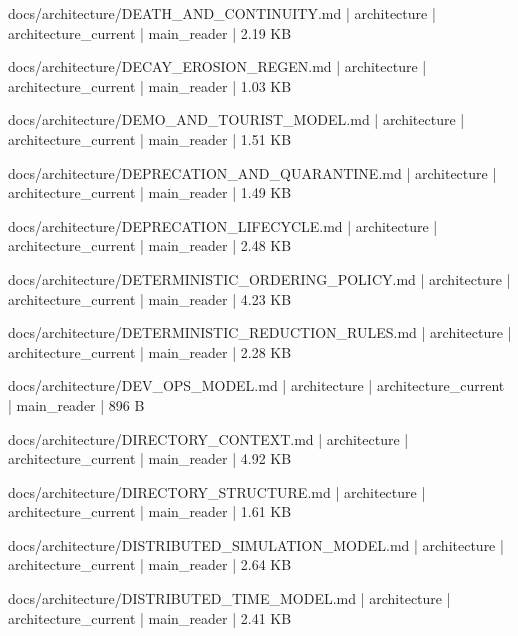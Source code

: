 \documentclass[11pt,a4paper]{report}
\begin{document}
{\small\ttfamily\raggedright docs/\allowbreak{}architecture/\allowbreak{}DEATH\_AND\_CONTINUITY.\allowbreak{}md | architecture | architecture\_current | main\_reader | 2.\allowbreak{}19 KB\par}
{\small\ttfamily\raggedright docs/\allowbreak{}architecture/\allowbreak{}DECAY\_EROSION\_REGEN.\allowbreak{}md | architecture | architecture\_current | main\_reader | 1.\allowbreak{}03 KB\par}
{\small\ttfamily\raggedright docs/\allowbreak{}architecture/\allowbreak{}DEMO\_AND\_TOURIST\_MODEL.\allowbreak{}md | architecture | architecture\_current | main\_reader | 1.\allowbreak{}51 KB\par}
{\small\ttfamily\raggedright docs/\allowbreak{}architecture/\allowbreak{}DEPRECATION\_AND\_QUARANTINE.\allowbreak{}md | architecture | architecture\_current | main\_reader | 1.\allowbreak{}49 KB\par}
{\small\ttfamily\raggedright docs/\allowbreak{}architecture/\allowbreak{}DEPRECATION\_LIFECYCLE.\allowbreak{}md | architecture | architecture\_current | main\_reader | 2.\allowbreak{}48 KB\par}
{\small\ttfamily\raggedright docs/\allowbreak{}architecture/\allowbreak{}DETERMINISTIC\_ORDERING\_POLICY.\allowbreak{}md | architecture | architecture\_current | main\_reader | 4.\allowbreak{}23 KB\par}
{\small\ttfamily\raggedright docs/\allowbreak{}architecture/\allowbreak{}DETERMINISTIC\_REDUCTION\_RULES.\allowbreak{}md | architecture | architecture\_current | main\_reader | 2.\allowbreak{}28 KB\par}
{\small\ttfamily\raggedright docs/\allowbreak{}architecture/\allowbreak{}DEV\_OPS\_MODEL.\allowbreak{}md | architecture | architecture\_current | main\_reader | 896 B\par}
{\small\ttfamily\raggedright docs/\allowbreak{}architecture/\allowbreak{}DIRECTORY\_CONTEXT.\allowbreak{}md | architecture | architecture\_current | main\_reader | 4.\allowbreak{}92 KB\par}
{\small\ttfamily\raggedright docs/\allowbreak{}architecture/\allowbreak{}DIRECTORY\_STRUCTURE.\allowbreak{}md | architecture | architecture\_current | main\_reader | 1.\allowbreak{}61 KB\par}
{\small\ttfamily\raggedright docs/\allowbreak{}architecture/\allowbreak{}DISTRIBUTED\_SIMULATION\_MODEL.\allowbreak{}md | architecture | architecture\_current | main\_reader | 2.\allowbreak{}64 KB\par}
{\small\ttfamily\raggedright docs/\allowbreak{}architecture/\allowbreak{}DISTRIBUTED\_TIME\_MODEL.\allowbreak{}md | architecture | architecture\_current | main\_reader | 2.\allowbreak{}41 KB\par}
\end{document}
